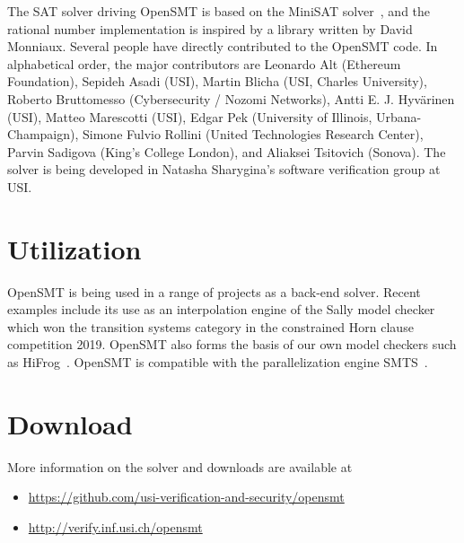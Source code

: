 \documentclass{article}
\begin{document}
The SAT solver driving OpenSMT is based on the MiniSAT
solver~\cite{EenS:SAT03}, and the rational number implementation is
inspired by a library written by David Monniaux.  Several people have
directly contributed to the OpenSMT code.  In alphabetical order, the
major contributors are
%
Leonardo Alt (Ethereum Foundation),
Sepideh Asadi (USI),
Martin Blicha (USI, Charles University),
Roberto Bruttomesso (Cybersecurity / Nozomi Networks),
Antti E. J. Hyv{\"a}rinen (USI),
Matteo Marescotti (USI),
Edgar Pek (University of Illinois, Urbana-Champaign),
Simone Fulvio Rollini (United Technologies Research Center),
Parvin Sadigova (King's College London), and
Aliaksei Tsitovich (Sonova).
%
The solver is being developed in Natasha Sharygina's software
verification group at USI.

\section{Utilization}

OpenSMT is being used in a range of projects as a back-end solver.
Recent examples include its use as an interpolation engine of the Sally
model checker~\cite{JovanovicD:FMCAD16} which won the transition systems
category in the constrained Horn clause competition 2019.  OpenSMT also
forms the basis of our own model checkers such as
HiFrog~\cite{AltACMFHS17}.  OpenSMT is compatible with the
parallelization engine SMTS~\cite{MarescottiHS18}.

\section{Download}
More information on the solver and downloads are available at

\begin{itemize}
    \item \url{https://github.com/usi-verification-and-security/opensmt}
    \item \url{http://verify.inf.usi.ch/opensmt}
\end{itemize}

\iffalse
in chronological order, work on interpolation 
algorithms~\cite{BlichaHKS19,AltHAS17,JancikAFHKS16,AsadiBFHESC18}
and parallel SMT 
solving~\cite{HyvarinenMSCS18,MarescottiHS18,HyvarinenMS:SAT15}.
OpenSMT2 is
used as the back-end in model-checking tools
HiFrog~\cite{AltACMFHS17},
eVolCheck~\cite{FSS_TACAS13}, 
FunFrog~\cite{SFS_ATVA12}, and
PeRIPLO~\cite{RolliniAFHS:LPAR2013,AltFHS:VSTTE2015}.
OpenSMT2 is a supported engine in the parallel 
solving framework SMTS~\cite{MarescottiHS16}.

\section{Acknowledgements}
We thank everyone who helped
developing OpenSMT2. In particular,
Leonardo Alt,
Sepideh Asadi,
Martin Blicha,
Roberto Bruttomesso,
Antti E. J. Hyv{\"a}rinen,
Matteo Marescotti,
Edgar Pek,
Simone Fulvio Rollini, 
Parvin Sadigova,
Natasha Sharygina,
Aliaksei Tsitovich.
\fi



\end{document}
